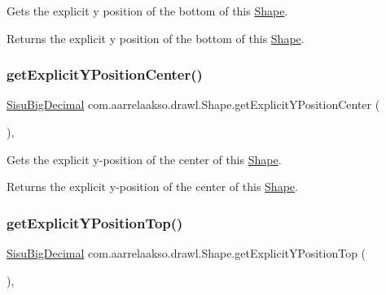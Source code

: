 Gets the explicit y position of the bottom of this \hyperlink{classcom_1_1aarrelaakso_1_1drawl_1_1_shape}{Shape}.

\begin{DoxyReturn}{Returns}
the explicit y position of the bottom of this \hyperlink{classcom_1_1aarrelaakso_1_1drawl_1_1_shape}{Shape}. 
\end{DoxyReturn}
\mbox{\label{classcom_1_1aarrelaakso_1_1drawl_1_1_shape_a6499eaa6fd9cdef3d77fe20a5b039401}} 
\subsubsection{\texorpdfstring{get\+Explicit\+Y\+Position\+Center()}{getExplicitYPositionCenter()}}
{\footnotesize\ttfamily \hyperlink{classcom_1_1aarrelaakso_1_1drawl_1_1_sisu_big_decimal}{Sisu\+Big\+Decimal} com.\+aarrelaakso.\+drawl.\+Shape.\+get\+Explicit\+Y\+Position\+Center (\begin{DoxyParamCaption}{ }\end{DoxyParamCaption})\hspace{0.3cm}{\ttfamily [protected]}, {\ttfamily [inherited]}}

Gets the explicit y-\/position of the center of this \hyperlink{classcom_1_1aarrelaakso_1_1drawl_1_1_shape}{Shape}.

\begin{DoxyReturn}{Returns}
the explicit y-\/position of the center of this \hyperlink{classcom_1_1aarrelaakso_1_1drawl_1_1_shape}{Shape}. 
\end{DoxyReturn}
\mbox{\label{classcom_1_1aarrelaakso_1_1drawl_1_1_shape_af5d7293539d67234c9941e6abc3e642b}} 
\subsubsection{\texorpdfstring{get\+Explicit\+Y\+Position\+Top()}{getExplicitYPositionTop()}}
{\footnotesize\ttfamily \hyperlink{classcom_1_1aarrelaakso_1_1drawl_1_1_sisu_big_decimal}{Sisu\+Big\+Decimal} com.\+aarrelaakso.\+drawl.\+Shape.\+get\+Explicit\+Y\+Position\+Top (\begin{DoxyParamCaption}{ }\end{DoxyParamCaption})\hspace{0.3cm}{\ttfamily [protected]}, {\ttfamily [inherited]}}

